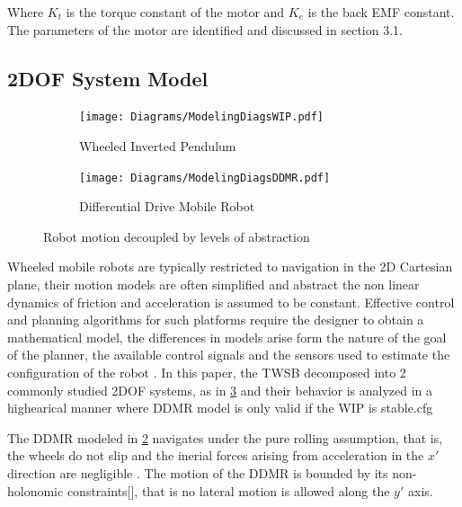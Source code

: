     Where $K_t$ is the torque constant of the motor and $K_e$ is the back EMF constant.
    The parameters of the motor are identified and discussed in section 3.1. 
    \pagebreak{}

    \subsection{2DOF System Model}
    \begin{figure}[h]
        \centering
        \begin{subfigure}[b]{0.4\textwidth}
            \texttt{[image: Diagrams/ModelingDiagsWIP.pdf]}
            \caption{Wheeled Inverted Pendulum}
            \label{fig:WIP}
        \end{subfigure}
        \hfill
        \begin{subfigure}[b]{0.4\textwidth}
            \texttt{[image: Diagrams/ModelingDiagsDDMR.pdf]}
            \caption{Differential Drive Mobile Robot}
            \label{fig:DDMR}
        \end{subfigure}
        \caption{Robot motion decoupled by levels of abstraction}
        \label{fig:2DOF}
    \end{figure}

    Wheeled mobile robots are typically restricted to navigation in the 2D Cartesian plane, their motion models are often simplified and 
    abstract the non linear dynamics of friction and acceleration is assumed to be constant. 
    Effective control and planning algorithms for such platforms require the designer to obtain a mathematical model, 
    the differences in models arise form the nature of the goal of the planner, the available control signals and the sensors 
    used to estimate the configuration of the robot \cite{ClassificationWheeled}. 
    In this paper, the TWSB decomposed into 2 commonly studied 2DOF systems, as in \ref{fig:2DOF} and their behavior is analyzed
    in a highearical manner where DDMR model is only valid if the WIP is stable.cfg
    
    The DDMR modeled in \ref{fig:DDMR} navigates under the pure rolling assumption, that is, the wheels do not slip 
    and the inerial forces arising from acceleration in the $x'$ direction are negligible \cite{KinematicWheeled}. 
    The motion of the DDMR is bounded by its non-holonomic constraints[], that is no lateral motion is allowed along the $y'$ axis. 

